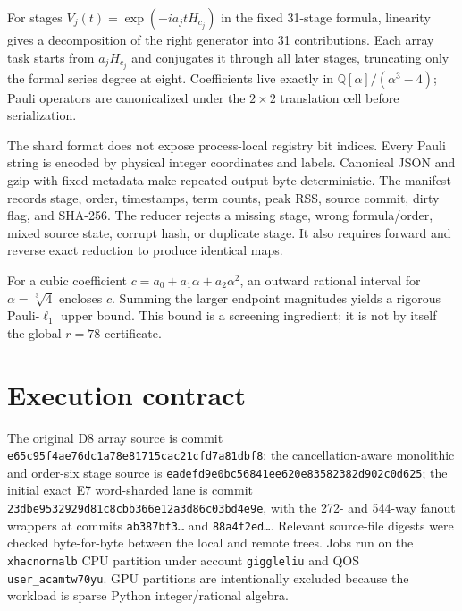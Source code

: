 \documentclass[10pt]{article}
\begin{document}
For stages $V_j(t)=\exp(-i a_j t H_{c_j})$ in the fixed 31-stage formula,
linearity gives a decomposition of the right generator into 31 contributions.
Each array task starts from $a_jH_{c_j}$ and conjugates it through all later
stages, truncating only the formal series degree at eight.  Coefficients live
exactly in $\mathbb{Q}[\alpha]/(\alpha^3-4)$; Pauli operators are canonicalized
under the $2\times2$ translation cell before serialization.

The shard format does not expose process-local registry bit indices.  Every
Pauli string is encoded by physical integer coordinates and labels.  Canonical
JSON and gzip with fixed metadata make repeated output byte-deterministic.
The manifest records stage, order, timestamps, term counts, peak RSS, source
commit, dirty flag, and SHA-256.  The reducer rejects a missing stage, wrong
formula/order, mixed source state, corrupt hash, or duplicate stage.  It also
requires forward and reverse exact reduction to produce identical maps.

For a cubic coefficient $c=a_0+a_1\alpha+a_2\alpha^2$, an outward rational
interval for $\alpha=\sqrt[3]{4}$ encloses $c$.  Summing the larger endpoint
magnitudes yields a rigorous Pauli-$\ell_1$ upper bound.  This bound is a
screening ingredient; it is not by itself the global $r=78$ certificate.

\section{Execution contract}

The original D8 array source is commit
\texttt{e65c95f4ae76dc1a78e81715cac21cfd7a81dbf8}; the cancellation-aware
monolithic and order-six stage source is
\texttt{eadefd9e0bc56841ee620e83582382d902c0d625}; the initial exact E7
word-sharded lane is commit
\texttt{23dbe9532929d81c8cbb366e12a3d86c03bd4e9e}, with the 272- and 544-way
fanout wrappers at commits \texttt{ab387bf3\ldots} and
\texttt{88a4f2ed\ldots}.  Relevant source-file
digests were checked byte-for-byte between the local and remote trees.  Jobs run on the
\texttt{xhacnormalb} CPU partition under account \texttt{giggleliu} and QOS
\texttt{user\_acamtw70yu}.  GPU partitions are intentionally excluded because
the workload is sparse Python integer/rational algebra.
\end{document}
